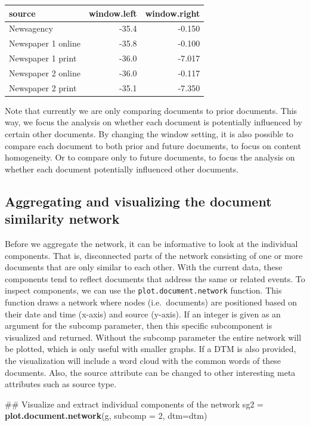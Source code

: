 \documentclass[]{article}
\newenvironment{Shaded}{\begin{snugshade}}{\end{snugshade}}
\newcommand{\KeywordTok}[1]{\textcolor[rgb]{0.13,0.29,0.53}{\textbf{{#1}}}}
\newcommand{\DataTypeTok}[1]{\textcolor[rgb]{0.13,0.29,0.53}{{#1}}}
\newcommand{\DecValTok}[1]{\textcolor[rgb]{0.00,0.00,0.81}{{#1}}}
\newcommand{\StringTok}[1]{\textcolor[rgb]{0.31,0.60,0.02}{{#1}}}
\newcommand{\NormalTok}[1]{{#1}}
\begin{document}
\begin{longtable}[c]{@{}lrr@{}}
\toprule
source & window.left & window.right\tabularnewline
\midrule
\endhead
Newsagency & -35.4 & -0.150\tabularnewline
Newspaper 1 online & -35.8 & -0.100\tabularnewline
Newspaper 1 print & -36.0 & -7.017\tabularnewline
Newspaper 2 online & -36.0 & -0.117\tabularnewline
Newspaper 2 print & -35.1 & -7.350\tabularnewline
\bottomrule
\end{longtable}

Note that currently we are only comparing documents to prior documents.
This way, we focus the analysis on whether each document is potentially
influenced by certain other documents. By changing the window setting,
it is also possible to compare each document to both prior and future
documents, to focus on content homogeneity. Or to compare only to future
documents, to focus the analysis on whether each document potentially
influenced other documents.

\subsection{Aggregating and visualizing the document similarity
network}\label{aggregating-and-visualizing-the-document-similarity-network}

Before we aggregate the network, it can be informative to look at the
individual components. That is, disconnected parts of the network
consisting of one or more documents that are only similar to each other.
With the current data, these components tend to reflect documents that
address the same or related events. To inspect components, we can use
the \texttt{plot.document.network} function. This function draws a
network where nodes (i.e.~documents) are positioned based on their date
and time (x-axis) and source (y-axis). If an integer is given as an
argument for the subcomp parameter, then this specific subcomponent is
visualized and returned. Without the subcomp parameter the entire
network will be plotted, which is only useful with smaller graphs. If a
DTM is also provided, the visualization will include a word cloud with
the common words of these documents. Also, the source attribute can be
changed to other interesting meta attributes such as source type.

\begin{Shaded}
\begin{Highlighting}[]
\NormalTok{## Visualize and extract individual components of the network }
\NormalTok{sg2 =}\StringTok{ }\KeywordTok{plot.document.network}\NormalTok{(g, }\DataTypeTok{subcomp =} \DecValTok{2}\NormalTok{, }\DataTypeTok{dtm=}\NormalTok{dtm)}
\end{Highlighting}
\end{Shaded}
\end{document}
